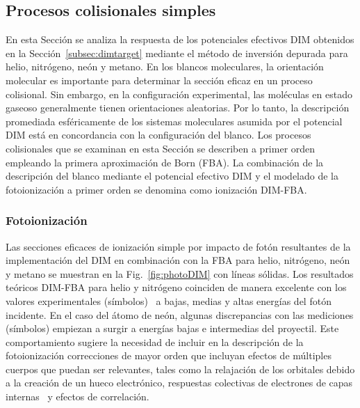 \subsection{Procesos colisionales simples}
\label{subsec:procol}

En esta Sección se analiza la respuesta de los potenciales efectivos 
DIM obtenidos en la Sección~\ref{subsec:dimtarget} mediante el método 
de inversión depurada para helio, nitrógeno, neón y metano.
En los blancos moleculares, la orientación molecular es importante para 
determinar la sección eficaz en un proceso colisional. Sin embargo, en 
la configuración experimental, las moléculas en estado gaseoso 
generalmente tienen orientaciones aleatorias. Por lo tanto, la 
descripción promediada esféricamente de los sistemas moleculares asumida 
por el potencial DIM está en concordancia con la configuración del 
blanco. Los procesos colisionales que se examinan en esta Sección se 
describen a primer orden empleando la primera aproximación de Born 
(FBA). La combinación de la descripción del blanco mediante el potencial 
efectivo DIM y el modelado de la fotoionización a primer orden se 
denomina como ionización DIM-FBA. 

\subsubsection{Fotoionización}

Las secciones eficaces de ionización simple por impacto de fotón 
resultantes de la implementación del DIM en combinación con la FBA para 
helio, nitrógeno, neón y metano se muestran en la 
Fig.~\ref{fig:photoDIM} con líneas sólidas. Los resultados teóricos 
DIM-FBA para helio y nitrógeno coinciden de manera excelente con los 
valores experimentales (símbolos)~\cite{Samson:90,Henke:93,Stolte:16} a 
bajas, medias y altas energías del fotón incidente. En el caso del átomo 
de neón, algunas discrepancias con las mediciones (símbolos) 
\cite{Henke:93,Samson:02} empiezan a surgir a energías bajas e 
intermedias del proyectil. Este comportamiento sugiere la necesidad de 
incluir en la descripción de la fotoionización correcciones de mayor 
orden que incluyan efectos de múltiples cuerpos que puedan ser 
relevantes, tales como la relajación de los orbitales debido a la 
creación de un hueco electrónico, respuestas colectivas de electrones 
de capas internas~\cite{Ederer:64} y efectos de correlación.

